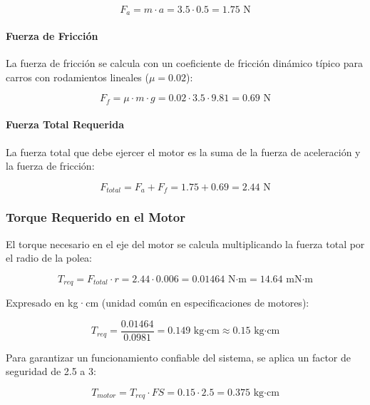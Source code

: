 \begin{equation}
    F_a = m \cdot a = 3.5 \cdot 0.5 = 1.75 \text{ N}
\end{equation}

\paragraph{Fuerza de Fricción}

La fuerza de fricción se calcula con un coeficiente de fricción dinámico típico para carros con rodamientos lineales ($\mu = 0.02$):

\begin{equation}
    F_f = \mu \cdot m \cdot g = 0.02 \cdot 3.5 \cdot 9.81 = 0.69 \text{ N}
\end{equation}

\paragraph{Fuerza Total Requerida}

La fuerza total que debe ejercer el motor es la suma de la fuerza de aceleración y la fuerza de fricción:

\begin{equation}
    F_{total} = F_a + F_f = 1.75 + 0.69 = 2.44 \text{ N}
\end{equation}

\subsubsection{Torque Requerido en el Motor}

El torque necesario en el eje del motor se calcula multiplicando la fuerza total por el radio de la polea:

\begin{equation}
    T_{req} = F_{total} \cdot r = 2.44 \cdot 0.006 = 0.01464 \text{ N·m} = 14.64 \text{ mN·m}
\end{equation}

Expresado en kg·cm (unidad común en especificaciones de motores):

\begin{equation}
    T_{req} = \frac{0.01464}{0.0981} = 0.149 \text{ kg·cm} \approx 0.15 \text{ kg·cm}
\end{equation}

Para garantizar un funcionamiento confiable del sistema, se aplica un factor de seguridad de 2.5 a 3:

\begin{equation}
    T_{motor} = T_{req} \cdot FS = 0.15 \cdot 2.5 = 0.375 \text{ kg·cm}
\end{equation}


